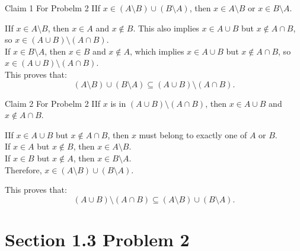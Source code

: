 \documentclass{report}
\begin{document}
\begin{ClaimWithMagnolia}{Claim 1 For Probelm 2}
    IIf $x \in \left(A \setminus B\right) \cup \left(B \setminus A \right)$, then $x \in A \setminus B$ or $x \in B \setminus A$.
\end{ClaimWithMagnolia}

\begin{RemarkWithLily}{1}
    IIf $x \in A \setminus B$, then $x \in A$ and $x \notin B$. This also implies $x \in A \cup B$ but $x \notin A \cap B$, so $x \in (A \cup B) \setminus (A \cap B)$. \\
    If $x \in B \setminus A$, then $x \in B$ and $x \notin A$, which implies $x \in A \cup B$ but $x \notin A \cap B$, so $x \in (A \cup B) \setminus (A \cap B)$. \\
    
    This proves that:
    \[
    \left(A \setminus B\right) \cup \left(B \setminus A \right) \subseteq \left( A \cup B \right) \setminus \left( A \cap B \right).
    \]
\end{RemarkWithLily}

\begin{ClaimWithMagnolia}{Claim 2 For Probelm 2}
    IIf $x$ is in $\left( A \cup B \right) \setminus \left( A \cap B \right)$, then $x \in A \cup B$ and $x \notin A \cap B$.
\end{ClaimWithMagnolia}

\begin{RemarkWithLily}{2}
    IIf $x \in A \cup B$ but $x \notin A \cap B$, then $x$ must belong to exactly one of $A$ or $B$. \\
    If $x \in A$ but $x \notin B$, then $x \in A \setminus B$. \\
    If $x \in B$ but $x \notin A$, then $x \in B \setminus A$. \\
    
    Therefore, $x \in \left(A \setminus B\right) \cup \left(B \setminus A \right)$.

    This proves that:
    \[
    \left( A \cup B \right) \setminus \left( A \cap B \right) \subseteq \left(A \setminus B\right) \cup \left(B \setminus A \right).
    \]
\end{RemarkWithLily}


\section*{Section 1.3 Problem 2}

\end{document}
